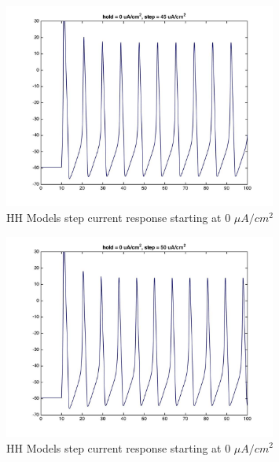 \documentclass{beamer}
\begin{document}
\begin{frame}
  \begin{figure}
    \centering
    \includegraphics[width = 0.8\textwidth]{./images/current_0_45.jpg}
    \caption{HH Models step current response starting at 0 $\mu A/cm^2$}
  \end{figure}
\end{frame}


\begin{frame}
  \begin{figure}
    \centering
    \includegraphics[width = 0.8\textwidth]{./images/current_0_50.jpg}
    \caption{HH Models step current response starting at 0 $\mu A/cm^2$}
  \end{figure}
\end{frame}
\end{document}
